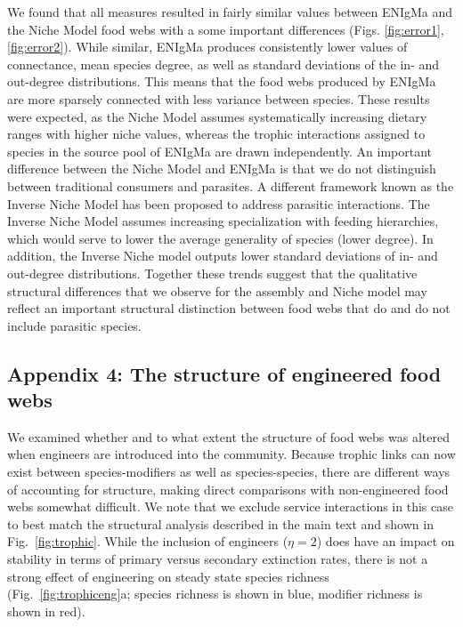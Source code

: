 \documentclass[twocolumn,preprintnumbers,amsmath,amssymb,superscriptaddress,linenumbers]{revtex4-1}
\begin{document}
\begin{bibunit}
We found that all measures resulted in fairly similar values between ENIgMa and the Niche Model food webs with a some important differences (Figs. \ref{fig:error1},\ref{fig:error2}).
While similar, ENIgMa produces consistently lower values of connectance, mean species degree, as well as standard deviations of the in- and out-degree distributions.
This means that the food webs produced by ENIgMa are more sparsely connected with less variance between species.
These results were expected, as the Niche Model assumes systematically increasing dietary ranges with higher niche values, whereas the trophic interactions assigned to species in the source pool of ENIgMa are drawn independently.
An important difference between the Niche Model and ENIgMa is that we do not distinguish between traditional consumers and parasites.
A different framework known as the Inverse Niche Model \cite{Warren2010} has been proposed to address parasitic interactions.
The Inverse Niche Model assumes increasing specialization with feeding hierarchies, which would serve to lower the average generality of species (lower degree).
In addition, the Inverse Niche model outputs lower standard deviations of in- and out-degree distributions.
Together these trends suggest that the qualitative structural differences that we observe for the assembly and Niche model may reflect an important structural distinction between food webs that do and do not include parasitic species.

\subsection*{Appendix 4: The structure of engineered food webs}
We examined whether and to what extent the structure of food webs was altered when engineers are introduced into the community.
Because trophic links can now exist between species-modifiers as well as species-species, there are different ways of accounting for structure, making direct comparisons with non-engineered food webs somewhat difficult.
We note that we exclude service interactions in this case to best match the structural analysis described in the main text and shown in Fig.\ \ref{fig:trophic}.
While the inclusion of engineers ($\eta = 2$) does have an impact on stability in terms of primary versus secondary extinction rates, there is not a strong effect of engineering on steady state species richness (Fig.\ \ref{fig:trophiceng}a; species richness is shown in blue, modifier richness is shown in red).


\end{bibunit}
\end{document}

